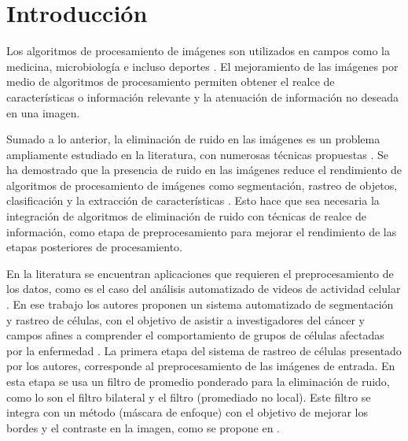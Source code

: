 
\chapter{Introducción}
\label{chp:intro}

Los algoritmos de procesamiento de imágenes son utilizados en campos como la medicina, microbiología e incluso deportes \cite{Aggarwal2011,	Ekin2003, Fils_BfilCells_2008}. El mejoramiento de las imágenes por medio de algoritmos de procesamiento permiten obtener el realce de características o información relevante y la atenuación de información no deseada en una imagen. 

Sumado a lo anterior, la eliminación de ruido en las imágenes es un problema ampliamente estudiado en la literatura, con numerosas técnicas propuestas \cite{edgpreservefilter}. Se ha demostrado que la presencia de ruido en las imágenes reduce el rendimiento de algoritmos de procesamiento de imágenes como segmentación, rastreo de objetos, clasificación y la extracción de características \cite{BF2014,IMPROVESEGMENTATIONBF,CONCAPAN2016}. Esto hace que sea necesaria la integración de algoritmos de eliminación de ruido con técnicas de realce de información, como etapa de preprocesamiento para mejorar el rendimiento de las etapas posteriores de procesamiento.  

En la literatura se encuentran aplicaciones que requieren el preprocesamiento de los datos, como es el caso del análisis automatizado de videos de actividad celular \cite{saenz2015deceived}. En ese trabajo los autores proponen un sistema automatizado de segmentación y rastreo de células, con el objetivo de asistir a investigadores del cáncer y campos afines a comprender el comportamiento de grupos de células afectadas por la enfermedad \cite{saenz2015deceived}. La primera etapa del sistema de rastreo de células presentado por los autores, corresponde al preprocesamiento de las imágenes de entrada. En esta etapa se usa un filtro de promedio ponderado para la eliminación de ruido, como lo son el filtro bilateral y el filtro  (promediado no local). Este filtro se integra con un método  (máscara de enfoque) con el objetivo de mejorar los bordes y el contraste en la imagen, como se propone en \cite{calderon2015dewaff}. 

